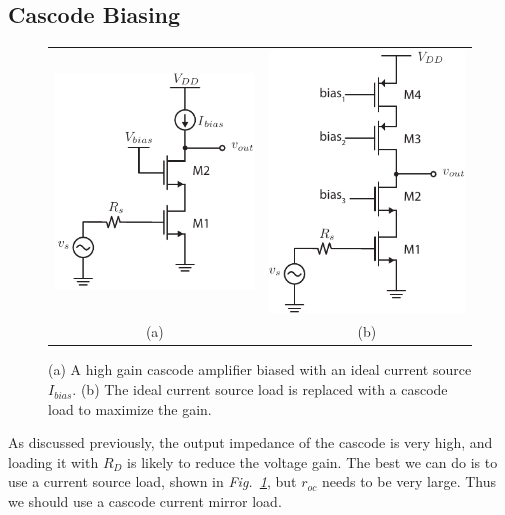 \subsection{Cascode Biasing}
\begin{figure}[tb]
\centering
\begin{tabular}{cc}
\includegraphics[scale=1]{15cascode_current_source_dc} &
\includegraphics[scale=1]{cascode_current_load_cascode.pdf}\\
(a) & (b)\\
\end{tabular}
\caption{(a) A high gain cascode amplifier biased with an ideal current source $I_{bias}$.  (b) The ideal current source load is replaced with a cascode load to maximize the gain.}  \label{fig:15cascode_current_source_dc}
\end{figure}
As discussed previously, the output impedance of the cascode is very high, and loading it with $R_D$ is likely to reduce the voltage gain.  The best we can do is to use a current source load, shown in \emph{Fig.~\ref{fig:15cascode_current_source_dc}}, but $r_{oc}$ needs to be very large. Thus we should use a cascode current mirror load.
